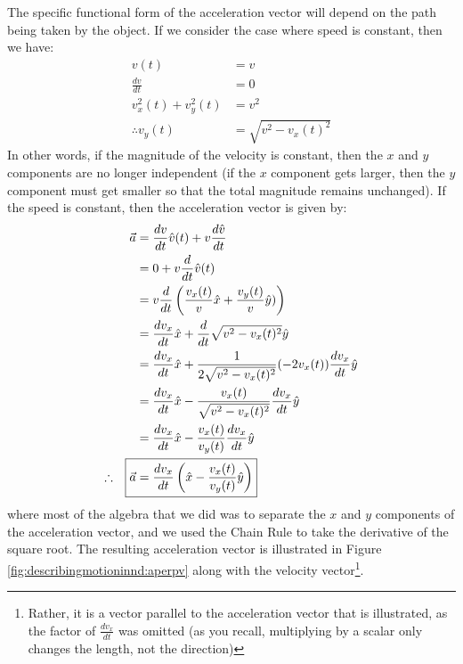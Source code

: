 The specific functional form of the acceleration vector will depend on the path being taken by the object. If we consider the case where speed is constant, then we have:
\begin{align*}
v(t) &= v \\
\frac{dv}{dt}&=0\\
v_x^2(t)+v_y^2(t) &=v^2 \\
\therefore v_y(t)&=\sqrt{v^2-v_x(t)^2}
\end{align*}
In other words, if the magnitude of the velocity is constant, then the $x$ and $y$ components are no longer independent (if the $x$ component gets larger, then the $y$ component must get smaller so that the total magnitude remains unchanged). If the speed is constant, then the acceleration vector is given by:
\begin{align}
\label{eqn:describingmotioninnd:vecaconstv}
\vec a&=\frac{dv}{dt}\hat v(t)+v\frac{d\hat v}{dt}\nonumber\\
&=0 + v\frac{d}{dt}\hat v(t)\nonumber\\
&=v\frac{d}{dt}\left(\frac{v_x(t)}{v}\hat x+\frac{v_y(t)}{v}\hat y   )\right)\nonumber\\
&=\frac{dv_x}{dt}\hat x + \frac{d}{dt}\sqrt{v^2-v_x(t)^2}\hat y\nonumber\\
&=\frac{dv_x}{dt}\hat x + \frac{1}{2\sqrt{v^2-v_x(t)^2}}(-2v_x(t))\frac{dv_x}{dt}\hat y\nonumber\\
&=\frac{dv_x}{dt}\hat x - \frac{v_x(t)}{\sqrt{v^2-v_x(t)^2}}\frac{dv_x}{dt}\hat y\nonumber\\
&=\frac{dv_x}{dt}\hat x - \frac{v_x(t)}{v_y(t)}\frac{dv_x}{dt}\hat y\nonumber\\
\therefore\quad\Aboxed{\vec a&=\frac{dv_x}{dt} \left(\hat x - \frac{v_x(t)}{v_y(t)}\hat y\right)}
\end{align}
where most of the algebra that we did was to separate the $x$ and $y$ components of the acceleration vector, and we used the Chain Rule to take the derivative of the square root. The resulting acceleration vector is illustrated in Figure \ref{fig:describingmotioninnd:aperpv} along with the velocity vector\footnote{Rather, it is a vector parallel to the acceleration vector that is illustrated, as the factor of $\frac{dv_x}{dt}$ was omitted (as you recall, multiplying by a scalar only changes the length, not the direction)}.
